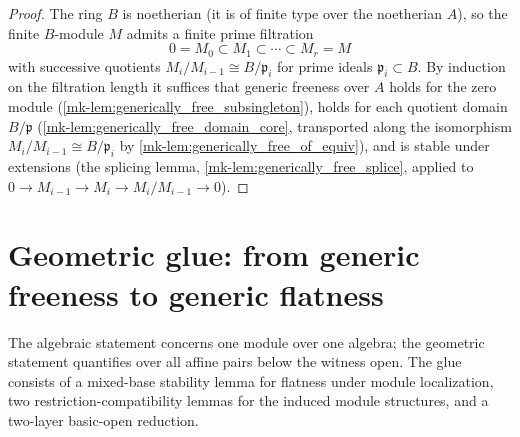 \begin{proof}
  \leanok
{}
  The ring \(B\) is noetherian (it is of finite type over the noetherian
  \(A\)), so the finite \(B\)-module \(M\) admits a finite prime filtration
  \[
    0 = M_0 \subset M_1 \subset \cdots \subset M_r = M
  \]
  with successive quotients \(M_i / M_{i-1} \cong B / \mathfrak{p}_i\) for
  prime ideals \(\mathfrak{p}_i \subset B\).  By induction on the filtration
  length it suffices that generic freeness over \(A\) holds for the zero
  module (\ref{mk-lem:generically_free_subsingleton}), holds for each quotient
  domain \(B/\mathfrak{p}\) (\ref{mk-lem:generically_free_domain_core},
  transported along the isomorphism \(M_i/M_{i-1} \cong B/\mathfrak{p}_i\) by
  \ref{mk-lem:generically_free_of_equiv}), and is stable under extensions
  (the splicing lemma, \ref{mk-lem:generically_free_splice}, applied to
  \(0 \to M_{i-1} \to M_i \to M_i/M_{i-1} \to 0\)).
\end{proof}

\section{Geometric glue: from generic freeness to generic flatness}

The algebraic statement concerns one module over one algebra; the geometric
statement quantifies over all affine pairs below the witness open. The glue
consists of a mixed-base stability lemma for flatness under module
localization, two restriction-compatibility lemmas for the induced module
structures, and a two-layer basic-open reduction.

